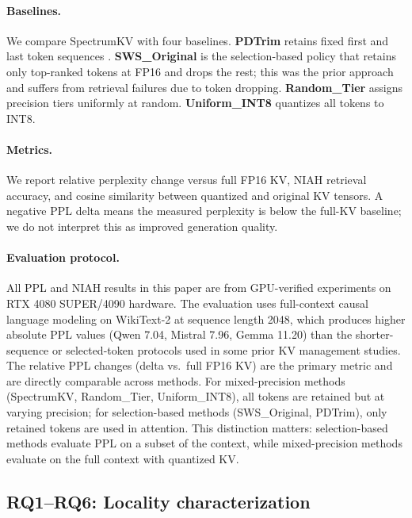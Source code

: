 \documentclass[11pt]{article}
\newcommand{\method}{SpectrumKV}
\theoremstyle{definition}
\theoremstyle{plain}
\begin{document}
\paragraph{Baselines.}
We compare \method{} with four baselines.  \textbf{PDTrim} retains fixed first and last token sequences \citep{pdtrim}.  \textbf{SWS\_Original} is the selection-based policy that retains only top-ranked tokens at FP16 and drops the rest; this was the prior approach and suffers from retrieval failures due to token dropping.  \textbf{Random\_Tier} assigns precision tiers uniformly at random.  \textbf{Uniform\_INT8} quantizes all tokens to INT8.

\paragraph{Metrics.}
We report relative perplexity change versus full FP16 KV, NIAH retrieval accuracy, and cosine similarity between quantized and original KV tensors.  A negative PPL delta means the measured perplexity is below the full-KV baseline; we do not interpret this as improved generation quality.

\paragraph{Evaluation protocol.}
All PPL and NIAH results in this paper are from GPU-verified experiments on RTX 4080 SUPER/4090 hardware.  The evaluation uses full-context causal language modeling on WikiText-2 at sequence length 2048, which produces higher absolute PPL values (Qwen 7.04, Mistral 7.96, Gemma 11.20) than the shorter-sequence or selected-token protocols used in some prior KV management studies.  The relative PPL changes (delta vs.\ full FP16 KV) are the primary metric and are directly comparable across methods.  For mixed-precision methods (SpectrumKV, Random\_Tier, Uniform\_INT8), all tokens are retained but at varying precision; for selection-based methods (SWS\_Original, PDTrim), only retained tokens are used in attention.  This distinction matters: selection-based methods evaluate PPL on a subset of the context, while mixed-precision methods evaluate on the full context with quantized KV.

\subsection{RQ1--RQ6: Locality characterization}
\label{sec:rq1-6}
\end{document}
